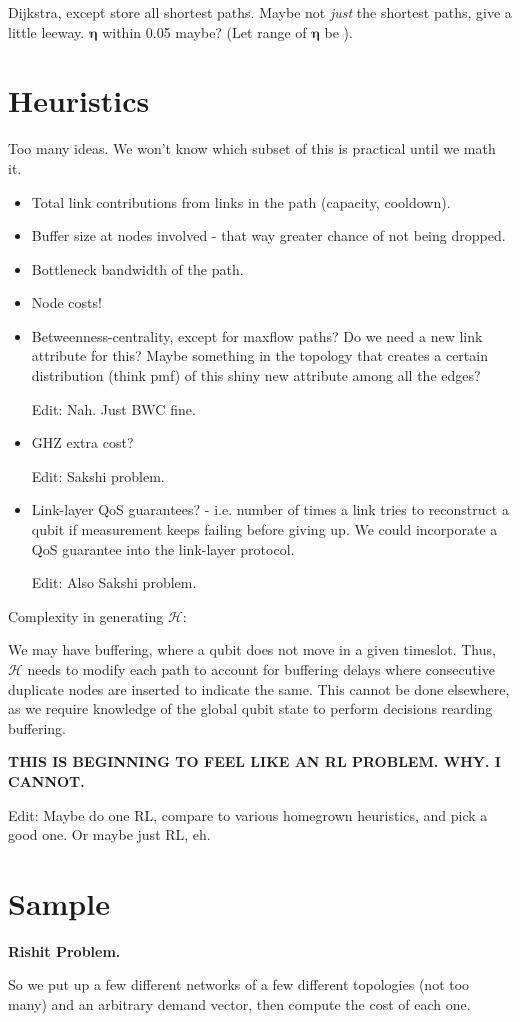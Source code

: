 \documentclass{amsart}
\begin{document}
    Dijkstra, except store all shortest paths.
    Maybe not \textit{just} the shortest paths, give a little leeway. \(\boldsymbol{\eta}\) within 0.05 maybe? (Let range of \(\boldsymbol{\eta}\) be ).



    \label{TODO:algorithm}

    \section{Heuristics}

    Too many ideas. We won't know which subset of this is practical until we math it.
    \begin{itemize}
        \item Total link contributions from links in the path (capacity, cooldown).
        \item Buffer size at nodes involved - that way greater chance of not being dropped.
        \item Bottleneck bandwidth of the path.
        \item Node costs! 
        \item Betweenness-centrality, except for maxflow paths? Do we need a new link attribute for this? Maybe something in the topology that creates a certain distribution (think pmf) of this shiny new attribute among all the edges? 
        
        Edit: Nah. Just BWC fine.
        \item GHZ extra cost? 
        
        Edit: Sakshi problem.

        \item Link-layer QoS guarantees? - i.e. number of times a link tries to reconstruct a qubit if measurement keeps failing before giving up. We could incorporate a QoS guarantee into the link-layer protocol. 
        
        Edit: Also Sakshi problem.

    \end{itemize}

    Complexity in generating \(\mathcal{H}\): 

    We may have buffering, where a qubit does not move in a given timeslot. Thus, \(\mathcal{H}\) needs to modify each path to account for buffering delays where consecutive duplicate nodes are inserted to indicate the same. This cannot be done elsewhere, as we require knowledge of the global qubit state to perform decisions rearding buffering.

    \textbf{THIS IS BEGINNING TO FEEL LIKE AN RL PROBLEM. WHY. I CANNOT.}

    Edit: Maybe do one RL, compare to various homegrown heuristics, and pick a good one. Or maybe just RL, eh.

    \section{Sample}

    \textbf{Rishit Problem.}

    So we put up a few different networks of a few different topologies (not too many) and an arbitrary demand vector, then compute the cost of each one. 
\end{document}
